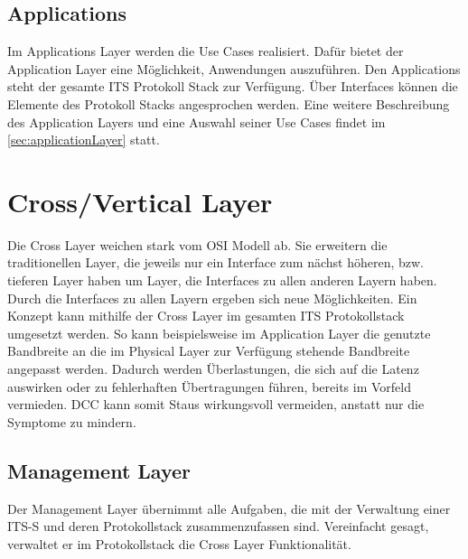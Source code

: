 \subsection{Applications}
Im Applications Layer werden die Use Cases realisiert. Dafür bietet der Application Layer eine Möglichkeit, Anwendungen auszuführen. Den Applications steht der gesamte \ac{ITS} Protokoll Stack zur Verfügung. Über Interfaces können die Elemente des Protokoll Stacks angesprochen werden.
Eine weitere Beschreibung des Application Layers und eine Auswahl seiner Use Cases findet im \autoref{sec:applicationLayer} statt.

\section{Cross/Vertical Layer}
Die Cross Layer weichen stark vom \ac{OSI} Modell ab. Sie erweitern die traditionellen Layer, die jeweils nur ein Interface zum nächst höheren, bzw. tieferen Layer haben um Layer, die Interfaces zu allen anderen Layern haben. Durch die Interfaces zu allen Layern ergeben sich neue Möglichkeiten. Ein Konzept kann mithilfe der Cross Layer im gesamten \ac{ITS} Protokollstack umgesetzt werden. So kann beispielsweise im Application Layer die genutzte Bandbreite an die im Physical Layer zur Verfügung stehende Bandbreite angepasst werden. Dadurch werden Überlastungen, die sich auf die Latenz auswirken oder zu fehlerhaften Übertragungen führen, bereits im Vorfeld vermieden. \ac{DCC} kann somit Staus wirkungsvoll vermeiden, anstatt nur die Symptome zu mindern.

\subsection{Management Layer \label{architektur_managementLayer}}
Der Management Layer übernimmt alle Aufgaben, die mit der Verwaltung einer \ac{ITS-S} und deren Protokollstack zusammenzufassen sind. Vereinfacht gesagt, verwaltet er im Protokollstack die Cross Layer Funktionalität. 


